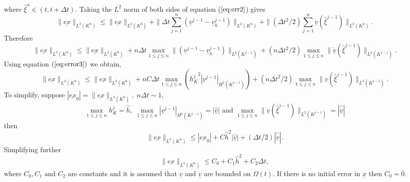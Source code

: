 \documentclass[11pt]{article}
\newcommand{\D}{\Delta}
\newcommand{\ul}{\underline}
\newcommand{\Om}{\Omega}
\begin{document}
where $\hat{\xi}^n \in (t,t+\D{t}).$ Taking the $L^2$ norm of both sides of equation ($\ref{eq:err2}$) gives
$$\|\ul{ex}\|_{L^{2}(K^n)} \leq \| \ul{ex}\|_{L^{2}(K^0)} + \|\D{t}\sum_{j=1}^{n}(\ul{v}^{j-1}-\ul{v}_h^{j-1})\|_{L^{2}(K^n)} + \|( \D{t}^2/2)\sum_{j=1}^{n}\dot{\ul{v}}(\hat{\xi}^{j-1})\|_{L^{2}(K^n)}.$$
Therefore
$$\|\ul{ex}\|_{L^{2}(K^n)} \leq \| \ul{ex}\|_{L^{2}(K^0)} + n\D{t}\max_{1 \leq j \leq n}\|(\ul{v}^{j-1}-\ul{v}_h^{j-1})\|_{L^{2}(K^{j-1})} + ( n\D{t}^2/2)\max_{1\leq j \leq n}\|\dot{\ul{v}}(\hat{\xi}^{j-1})\|_{L^{2}(K^{j-1})}.$$
Using equation $(\ref{eq:error3})$ we obtain,
\begin{equation}
\label{eq:err3}
\|\ul{ex}\|_{L^{2}(K^n)} \leq \| \ul{ex}\|_{L^{2}(K^0)} + nC\D{t}\max_{1 \leq j \leq n}\left({h_K^j}^2|\ul{v}^{j-1}|_{H^2(K^{j-1})}\right)  + ( n\D{t}^2/2)\max_{1\leq j \leq n}\|\dot{\ul{v}}(\hat{\xi}^{j-1})\|_{L^{2}(K^{j-1})}.
\end{equation}
To simplify, suppose $|\ul{ex}_0| =    \|\ul{ex}\|_{L^{2}(K^0)}, \;n\D{t} \sim 1,$
$$\max_{1\leq{j}\leq {n}}h_K^j = \hat{h},\;\max_{1\leq{j}\leq{n}}|\ul{v}^{j-1}|_{H^2(K^{j-1})} = |\hat{\ul{v}}| \text{ and }  \max_{1\leq j \leq n}\|\dot{\ul{v}}(\hat{\xi}^{j-1})\|_{L^{2}(K^{j-1})} =   |\hat{\dot{\ul{v}}}|                                       $$  then
\begin{equation}
\label{eq:err4}
\|\ul{ex}\|_{L^{2}(K^n)} \leq{|\ul{ex}_0|} + C\hat{h}^2|\hat{\ul{v}}| + (\D{t}/2)|\hat{\dot{\ul{v}}}|.
\end{equation}
Simplifying further
\begin{equation}
\label{eq:err5}
\|\ul{ex}\|_{L^{2}(K^n)} \leq C_0 + C_1\hat{h}^2 + C_2\D{t},
\end{equation}
where $C_0, C_1 \text{ and } C_2$ are constants and it is assumed that $\ul{v}$ and $\dot{\ul{v}}$ are bounded on $\Om(t)$. If there is no initial error in $\ul{x}$ then $C_0=0$.
\end{document}
